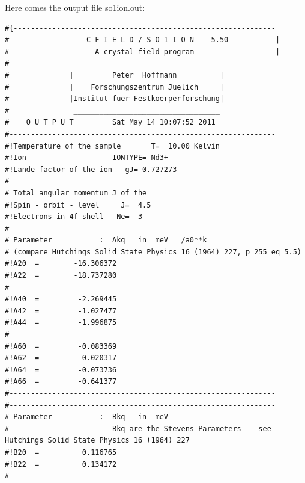 \begin{enumerate}
Here comes the output file {\prg so1ion.out}:
{\footnotesize
\begin{verbatim}
#{------------------------------------------------------------- 
#                  C F I E L D / S O 1 I O N    5.50           |
#                    A crystal field program                   |
#               __________________________________              
#              |         Peter  Hoffmann          |             
#              |    Forschungszentrum Juelich     |             
#              |Institut fuer Festkoerperforschung|             
#               __________________________________              
#    O U T P U T         Sat May 14 10:07:52 2011
#-------------------------------------------------------------- 
#!Temperature of the sample       T=  10.00 Kelvin                
#!Ion                    IONTYPE= Nd3+                          
#!Lande factor of the ion   gJ= 0.727273                       
#                                                              
# Total angular momentum J of the                               
#!Spin - orbit - level     J=  4.5                            
#!Electrons in 4f shell   Ne=  3                              
#-------------------------------------------------------------- 
# Parameter           :  Akq   in  meV   /a0**k                  
# (compare Hutchings Solid State Physics 16 (1964) 227, p 255 eq 5.5)                             
#!A20  =        -16.306372                                     
#!A22  =        -18.737280                                     
#                                                              
#!A40  =         -2.269445                                     
#!A42  =         -1.027477                                     
#!A44  =         -1.996875                                     
#                                                              
#!A60  =         -0.083369                                     
#!A62  =         -0.020317                                     
#!A64  =         -0.073736                                     
#!A66  =         -0.641377                                     
#-------------------------------------------------------------- 
#-------------------------------------------------------------- 
# Parameter           :  Bkq   in  meV                           
#                        Bkq are the Stevens Parameters  - see Hutchings Solid State Physics 16 (1964) 227
#!B20  =          0.116765                                     
#!B22  =          0.134172                                     
#                                                              

\end{verbatim}}
\end{enumerate}
